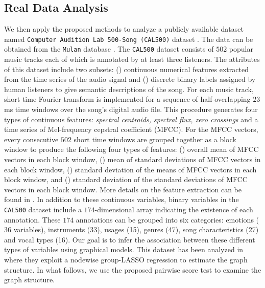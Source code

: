 \documentclass[twoside,11pt]{article}
\newcommand{\rmnum}[1]{\romannumeral #1}
\begin{document}
\subsection{Real Data Analysis}
We then apply the proposed methods to analyze a publicly available dataset named \texttt{Computer Audition Lab 500-Song (CAL500)} dataset \citep{turnbull2008semantic}. The data can be obtained from the \texttt{Mulan} database \citep{tsoumakas2011mulan}. The \texttt{CAL500} dataset consists of $502$ popular music tracks each of which is annotated by at least  three listeners. The attributes of this dataset include two subsets: (\rmnum{1}) continuous numerical  features extracted from the time series of the audio signal and (\rmnum{2}) discrete binary labels assigned by human listeners to give semantic descriptions of the song. For each music track,  short time Fourier transform is implemented for a sequence of half-overlapping $23$ms time windows over the song's digital audio file. This procedure generates four types of continuous features: \textit{spectral centroids, spectral flux, zero crossings} and a time series of Mel-frequency cepstral coefficient (MFCC).  For the MFCC vectors, every consecutive $502$ short time windows are  grouped together as a block window to produce the following four types of features: (\rmnum{1}) overall mean of MFCC vectors in each block window, (\rmnum{2}) mean of standard deviations of MFCC vectors in each block window, (\rmnum{3}) standard deviation of the means of  MFCC vectors in  each block window, and (\rmnum{4}) standard deviation of the standard deviations of MFCC vectors in each block window.  More details on the feature extraction can be found in  \cite{tzanetakis2002musical}. In addition to  these continuous variables, binary variables in the \texttt{CAL500} dataset include a $174$-dimensional array indicating the existence of each annotation.    These $174$ annotations can be grouped into six categories: emotions ($36$ variables), instruments (33), usages (15), genres (47), song characteristics (27)
and vocal types (16). %
Our goal is to infer the association between these different types of variables using graphical models. This dataset has been analyzed in \cite{cheng2013high} where they exploit a nodewise group-LASSO regression  to estimate the graph structure. In what follows, we use the proposed pairwise score test to examine the graph structure.
\end{document}

